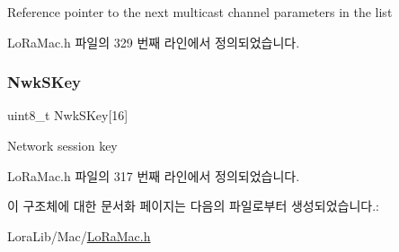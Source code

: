 Reference pointer to the next multicast channel parameters in the list 

Lo\+Ra\+Mac.\+h 파일의 329 번째 라인에서 정의되었습니다.

\mbox{\label{structs_multicast_params_adb8f473333a3f15032a04a78260f8ead}} 
\subsubsection{\texorpdfstring{Nwk\+S\+Key}{NwkSKey}}
{\footnotesize\ttfamily uint8\+\_\+t Nwk\+S\+Key\mbox{[}16\mbox{]}}

Network session key 

Lo\+Ra\+Mac.\+h 파일의 317 번째 라인에서 정의되었습니다.



이 구조체에 대한 문서화 페이지는 다음의 파일로부터 생성되었습니다.\+:\begin{DoxyCompactItemize}
\item 
Lora\+Lib/\+Mac/\mbox{\hyperlink{_lo_ra_mac_8h}{Lo\+Ra\+Mac.\+h}}\end{DoxyCompactItemize}
